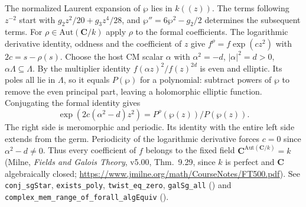 The normalized Laurent expansion of $\wp$ lies in $k((z))$.
The terms following $z^{-2}$ start with $g_2z^2/20+g_3z^4/28$,
and $\wp''=6\wp^2-g_2/2$ determines the subsequent terms.
For $\rho\in\mathrm{Aut}(\mathbf C/k)$ apply $\rho$ to the
formal coefficients. The logarithmic derivative identity, oddness and
the coefficient of $z$ give $f^\rho=f\exp(cz^2)$ with
$2c=s-\rho(s)$. Choose the host CM scalar $\alpha$ with
$\alpha^2=-d$, $|\alpha|^2=d>0$, $\alpha\Lambda\subseteq\Lambda$.
By the multiplier identity $f(\alpha z)^2/f(z)^{2d}$ is even and elliptic.
Its poles all lie in $\Lambda$, so it equals $P(\wp)$ for a polynomial:
subtract powers of $\wp$ to remove the even principal part, leaving a
holomorphic elliptic function. Conjugating the formal identity gives
\[
 \exp(2c(\alpha^2-d)z^2)=P^\rho(\wp(z))/P(\wp(z)).
\]
The right side is meromorphic and periodic. Its identity with the
entire left side extends from the germ. Periodicity of the logarithmic
derivative forces $c=0$ since $\alpha^2-d\ne0$. Thus every coefficient
of $f$ belongs to the fixed field $\mathbf C^{\mathrm{Aut}(\mathbf C/k)}=k$
(Milne, \emph{Fields and Galois Theory}, v5.00, Thm.~9.29, since $k$ is
perfect and $\mathbf C$ algebraically closed;
\url{https://www.jmilne.org/math/CourseNotes/FT500.pdf}).
See \nolinkurl{conj_sgStar}, \nolinkurl{exists_poly}, \nolinkurl{twist_eq_zero},
\nolinkurl{galSg_all} ()
and \nolinkurl{complex_mem_range_of_forall_algEquiv}
().

